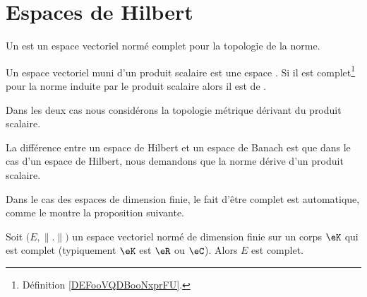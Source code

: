 
\section{Espaces de Hilbert}

\begin{definition}  \label{DefVKuyYpQ}
    Un  est un espace vectoriel normé complet pour la topologie de la norme. 
\end{definition}

\begin{definition}  \label{DefORuBdBN}
    Un espace vectoriel muni d'un produit scalaire est une espace . Si il est complet\footnote{Définition \ref{DEFooVQDBooNxprFU}.} pour la norme induite par le produit scalaire alors il est de .

    Dans les deux cas nous considérons la topologie métrique dérivant du produit scalaire.
\end{definition}

La différence entre un espace de Hilbert et un espace de Banach est que dans le cas d'un espace de Hilbert, nous demandons que la norme dérive d'un produit scalaire.

Dans le cas des espaces de dimension finie, le fait d'être complet est automatique, comme le montre la proposition suivante.
\begin{proposition}     \label{PROPooGJDTooXOoYfw}
    Soit \( \big( E,\| . \| \big)\) un espace vectoriel normé de dimension finie sur un corps \( \eK\) qui est complet (typiquement \( \eK\) est \( \eR\) ou \( \eC\)). Alors \( E\) est complet.
\end{proposition}

